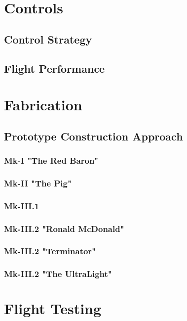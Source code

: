 \documentclass[11pt]{article}
\begin{document}
\section{Controls}
\label{Controls}
\subsection{Control Strategy}
\label{CtrlStr}
\subsection{Flight Performance}
\label{CtrlFlightPerf}


\section{Fabrication}
\label{Fabrication}
\subsection{Prototype Construction Approach}
\label{ProtoConsAppr}
\subsubsection{Mk-I "The Red Baron"}
\label{mk1}
\subsubsection{Mk-II "The Pig"}
\label{mk2}
\subsubsection{Mk-III.1}
\label{mk3.1}
\subsubsection{Mk-III.2 "Ronald McDonald"}
\label{mk3.2}
\subsubsection{Mk-III.2 "Terminator"}
\label{mk3.3}
\subsubsection{Mk-III.2 "The UltraLight"}
\label{mk3.4}

\section{Flight Testing}
\label{FlightTesting}
\end{document}
